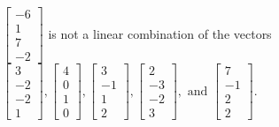 \begin{exercise}
\begin{exerciseStatement}
  \end{exerciseStatement}
  \begin{exerciseAnswer}
   \(\left[\begin{array}{c}
-6 \\
1 \\
7 \\
-2
\end{array}\right]\) 
  	 is not  
	a linear combination of the vectors \(\left[\begin{array}{c}
3 \\
-2 \\
-2 \\
1
\end{array}\right] , \left[\begin{array}{c}
4 \\
0 \\
1 \\
0
\end{array}\right] , \left[\begin{array}{c}
3 \\
-1 \\
1 \\
2
\end{array}\right] , \left[\begin{array}{c}
2 \\
-3 \\
-2 \\
3
\end{array}\right] , \text{ and } \left[\begin{array}{c}
7 \\
-1 \\
2 \\
2
\end{array}\right]\).

	
  


  \end{exerciseAnswer}
\end{exercise}